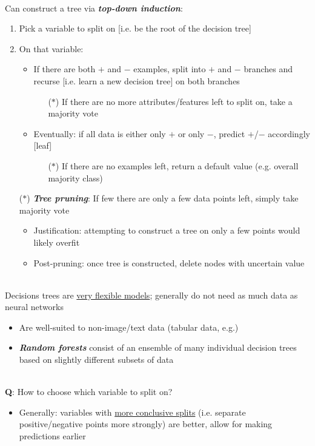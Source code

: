 \documentclass[12pt]{extarticle}
\theoremstyle{definition}
\theoremstyle{remark}
\newcommand{\pstart}[0]{\noindent}
\newcommand{\newp}[0]{~\\ \pstart}
\newcommand{\term}[1]{\noindent\textbf{\textit{#1}}}
\begin{document}
~\\ \pstart
Can construct a tree via \term{top-down induction}: \begin{enumerate}
    \item Pick a variable to split on [i.e. be the root of the decision tree]
    \item On that variable: \begin{itemize}
        \item If there are both $+$ and $-$ examples, split into $+$ and $-$ branches and recurse [i.e. learn a new decision tree] on both branches \begin{itemize}
            \item[($\ast$)] If there are no more attributes/features left to split on, take a majority vote
        \end{itemize}
        \item Eventually: if all data is either only $+$ or only $-$, predict $+$/$-$ accordingly [leaf] \begin{itemize}
            \item[($\ast$)] If there are no examples left, return a default value (e.g. overall majority class)
        \end{itemize}
    \end{itemize}
    \item[($\ast$)] \term{Tree pruning}: If few there are only a few data points left, simply take majority vote \begin{itemize}
        \item Justification: attempting to construct a tree on only a few points would likely overfit
        \item Post-pruning: once tree is constructed, delete nodes with uncertain value
    \end{itemize}
\end{enumerate}

\newp
Decisions trees are \ul{very flexible models}; generally do not need as much data as neural networks \begin{itemize}
    \item Are well-suited to non-image/text data (tabular data, e.g.)
    \item \term{Random forests} consist of an ensemble of many individual decision trees based on slightly different subsets of data
\end{itemize}

\newp
\textbf{Q}: How to choose which variable to split on? \begin{itemize}
    \item Generally: variables with \ul{more conclusive splits} (i.e. separate positive/negative points more strongly) are better, allow for making predictions earlier
\end{itemize}
\end{document}
